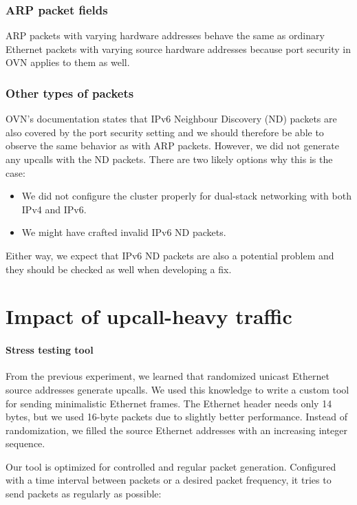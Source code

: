 \subsubsection{ARP packet fields}

ARP packets with varying hardware addresses behave the same as ordinary Ethernet packets with varying source hardware addresses because port security in OVN applies to them as well.

\subsubsection{Other types of packets}

OVN's documentation states that IPv6 Neighbour Discovery (ND) packets are also covered by the port security setting and we should therefore be able to observe the same behavior as with ARP packets. However, we did not generate any upcalls with the ND packets. There are two likely options why this is the case:

\begin{itemize}
    \item We did not configure the cluster properly for dual-stack networking with both IPv4 and IPv6.

    \item We might have crafted invalid IPv6 ND packets.
\end{itemize}

Either way, we expect that IPv6 ND packets are also a potential problem and they should be checked as well when developing a fix.

\section{Impact of upcall-heavy traffic}
\label{design:upcall-impact}

\paragraph{Stress testing tool}
From the previous experiment, we learned that randomized unicast Ethernet source addresses generate upcalls. We used this knowledge to write a custom tool for sending minimalistic Ethernet frames. The Ethernet header needs only 14 bytes, but we used 16-byte packets due to slightly better performance. Instead of randomization, we filled the source Ethernet addresses with an increasing integer sequence.

Our tool is optimized for controlled and regular packet generation. Configured with a time interval between packets or a desired packet frequency, it tries to send packets as regularly as possible:

